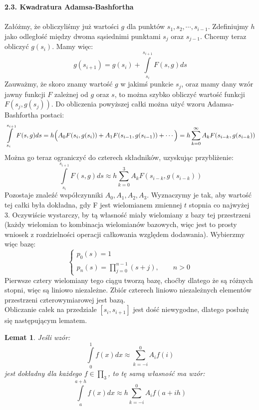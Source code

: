 \documentclass[a4paper]{article}
\newtheorem{theorem}{Lemat}
\begin{document}
\large
\textbf{2.3. Kwadratura Adamsa-Bashfortha}\\\\
\normalsize
Załóżmy, że obliczyliśmy już wartości $g$ dla punktów $s_1, s_2, \cdots, s_{i-1}$. Zdefiniujmy $h$ jako odległość między dwoma sąsiednimi punktami $s_j$ oraz $s_{j-1}$. Chcemy teraz obliczyć $g(s_i)$. Mamy więc:
$$g(s_{i+1}) = g(s_i) +  \int\limits_{s_i}^{s_{i+1}} F(s,g) ds$$
Zauważmy, że skoro znamy wartość $g$ w jakimś punkcie $s_j$, oraz mamy dany wzór jawny funkcji $F$ zależnej od $g$ oraz $s$, to można szybko obliczyć wartość funkcji $F(s_j, g(s_j))$. Do obliczenia powyższej całki można użyć wzoru Adamsa-Bashfortha \cite{KI} postaci:
\begin{equation}\label{coeff}
\int\limits_{s_i}^{s_{i+1}} F(s,g) ds = h\Bigl(A_0F(s_i,g(s_i)) + A_1F(s_{i-1},g(s_{i-1})) + \cdots\Bigr) = h\sum_{k=0}^{\infty}A_kF(s_{i-k},g(s_{i-k}))
\end{equation}
Można go teraz ograniczyć do czterech składników, uzyskując przybliżenie:
$$\int\limits_{s_i}^{s_{i+1}} F(s,g) ds \approx h\sum_{k=0}^{3}A_kF(s_{i-k},g(s_{i-k}))$$
Pozostaje znaleźć współczynniki $A_0, A_1, A_2, A_3$. Wyznaczymy je tak, aby wartość tej całki była dokładna, gdy F jest wielomianem zmiennej $t$ stopnia co najwyżej 3. Oczywiście wystarczy, by tą własność miały wielomiany z bazy tej przestrzeni (każdy wielomian to kombinacja wielomianów bazowych, więc jest to prosty wniosek z rozdzielności operacji całkowania względem dodawania). Wybierzmy więc bazę:
\begin{equation}\label{poly}
\begin{cases}
p_0(s) = 1\\
p_n(s) = \prod_{j=0}^{n-1} (s+j), \quad \quad n>0
\end{cases}
\end{equation}
Pierwsze cztery wielomiany tego ciągu tworzą bazę, choćby dlatego że są różnych stopni, więc są liniowo niezależne. Zbiór czterech liniowo niezależnych elementów przestrzeni czterowymiarowej jest bazą.\\
Obliczanie całek na przedziale $[s_i, s_{i+1}]$ jest dość niewygodne, dlatego posłużę się następującym lematem.
\begin{theorem}
Jeśli wzór:
\begin{equation} \label{lemmaa}
\int\limits_0^1f(x)dx \approx \sum_{k=-i}^0 A_i f(i)
\end{equation}
jest dokładny dla każdego $f \in \prod_3$, to tę samą własność ma wzór:
\begin{equation}\label{lemmab}
\int\limits_a^{a+h} f(x)dx \approx h\sum_{k=-i}^0 A_i f(a+ih)
\end{equation}
\end{theorem}
\end{document}
